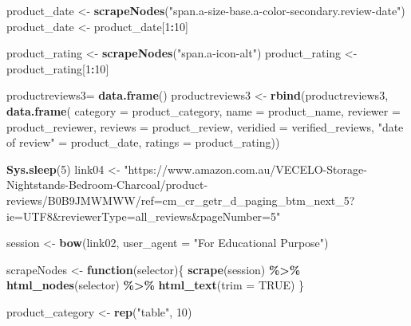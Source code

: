 \documentclass[
]{article}
\newenvironment{Shaded}{\begin{snugshade}}{\end{snugshade}}
\newcommand{\AttributeTok}[1]{\textcolor[rgb]{0.13,0.29,0.53}{#1}}
\newcommand{\ConstantTok}[1]{\textcolor[rgb]{0.56,0.35,0.01}{#1}}
\newcommand{\ControlFlowTok}[1]{\textcolor[rgb]{0.13,0.29,0.53}{\textbf{#1}}}
\newcommand{\DecValTok}[1]{\textcolor[rgb]{0.00,0.00,0.81}{#1}}
\newcommand{\FunctionTok}[1]{\textcolor[rgb]{0.13,0.29,0.53}{\textbf{#1}}}
\newcommand{\NormalTok}[1]{#1}
\newcommand{\OtherTok}[1]{\textcolor[rgb]{0.56,0.35,0.01}{#1}}
\newcommand{\SpecialCharTok}[1]{\textcolor[rgb]{0.81,0.36,0.00}{\textbf{#1}}}
\newcommand{\StringTok}[1]{\textcolor[rgb]{0.31,0.60,0.02}{#1}}
\begin{document}
\begin{Shaded}
\begin{Highlighting}[]
\NormalTok{  product\_date }\OtherTok{\textless{}{-}} \FunctionTok{scrapeNodes}\NormalTok{(}\StringTok{"span.a{-}size{-}base.a{-}color{-}secondary.review{-}date"}\NormalTok{)}
\NormalTok{  product\_date }\OtherTok{\textless{}{-}}\NormalTok{ product\_date[}\DecValTok{1}\SpecialCharTok{:}\DecValTok{10}\NormalTok{]}
  
\NormalTok{  product\_rating }\OtherTok{\textless{}{-}} \FunctionTok{scrapeNodes}\NormalTok{(}\StringTok{"span.a{-}icon{-}alt"}\NormalTok{)}
\NormalTok{  product\_rating }\OtherTok{\textless{}{-}}\NormalTok{ product\_rating[}\DecValTok{1}\SpecialCharTok{:}\DecValTok{10}\NormalTok{]}
  
\NormalTok{  productreviews3}\OtherTok{=} \FunctionTok{data.frame}\NormalTok{()}
\NormalTok{  productreviews3 }\OtherTok{\textless{}{-}} \FunctionTok{rbind}\NormalTok{(productreviews3, }\FunctionTok{data.frame}\NormalTok{(}
                      \AttributeTok{category =}\NormalTok{ product\_category,}
                      \AttributeTok{name =}\NormalTok{ product\_name,}
                      \AttributeTok{reviewer =}\NormalTok{ product\_reviewer,}
                      \AttributeTok{reviews =}\NormalTok{ product\_review,}
                      \AttributeTok{veridied =}\NormalTok{ verified\_reviews,}
                      \StringTok{"date of review"} \OtherTok{=}\NormalTok{ product\_date,}
                      \AttributeTok{ratings =}\NormalTok{ product\_rating))}
  
   \FunctionTok{Sys.sleep}\NormalTok{(}\DecValTok{5}\NormalTok{)}
\NormalTok{link04 }\OtherTok{\textless{}{-}} \StringTok{"https://www.amazon.com.au/VECELO{-}Storage{-}Nightstands{-}Bedroom{-}Charcoal/product{-}reviews/B0B9JMWMWW/ref=cm\_cr\_getr\_d\_paging\_btm\_next\_5?ie=UTF8\&reviewerType=all\_reviews\&pageNumber=5"}


\NormalTok{  session }\OtherTok{\textless{}{-}} \FunctionTok{bow}\NormalTok{(link02,}
               \AttributeTok{user\_agent =} \StringTok{"For Educational Purpose"}\NormalTok{)}

\NormalTok{  scrapeNodes }\OtherTok{\textless{}{-}} \ControlFlowTok{function}\NormalTok{(selector)\{}
    \FunctionTok{scrape}\NormalTok{(session) }\SpecialCharTok{\%\textgreater{}\%}
      \FunctionTok{html\_nodes}\NormalTok{(selector) }\SpecialCharTok{\%\textgreater{}\%}
      \FunctionTok{html\_text}\NormalTok{(}\AttributeTok{trim =} \ConstantTok{TRUE}\NormalTok{)}
\NormalTok{  \}}

\NormalTok{  product\_category }\OtherTok{\textless{}{-}} \FunctionTok{rep}\NormalTok{(}\StringTok{"table"}\NormalTok{, }\DecValTok{10}\NormalTok{)}


\end{Highlighting}
\end{Shaded}
\end{document}
